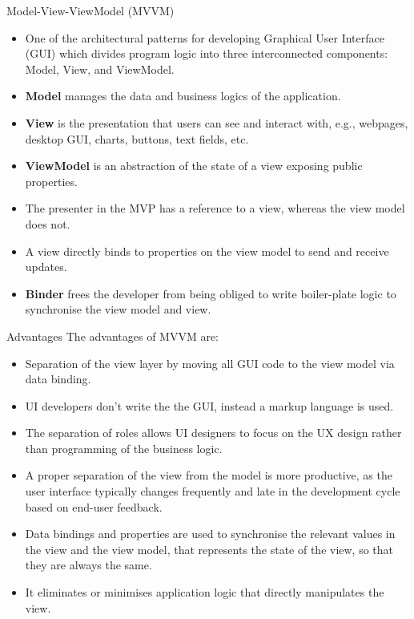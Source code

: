 \documentclass{beamer}
\begin{document}
\begin{frame}{Model-View-ViewModel (MVVM)}
\begin{itemize}
\item One of the architectural patterns for developing Graphical User Interface (GUI) which divides program logic into three interconnected components: Model, View, and ViewModel.
\item \textbf{Model} manages the data and business logics of the application.
\item \textbf{View} is the presentation that users can see and interact with, e.g., webpages, desktop GUI, charts, buttons, text fields, etc.
\item \textbf{ViewModel} is an abstraction of the state of a view exposing public properties. 
\item The presenter in the MVP has a reference to a view, whereas the view model does not. 
\item A view directly binds to properties on the view model to send and receive updates.
\item \textbf{Binder} frees the developer from being obliged to write boiler-plate logic to synchronise the view model and view.  

\end{itemize}
\end{frame}

\begin{frame}{Advantages}
The advantages of MVVM are:
\begin{itemize}
\item Separation of the view layer by moving all GUI code to the view model via data binding.
\item UI developers don't write the the GUI, instead a markup language is used.
\item The separation of roles allows UI designers to focus on the UX design rather than programming of the business logic. 
\item A proper separation of the view from the model is more productive, as the user interface typically changes frequently and late in the development cycle based on end-user feedback.
\item Data bindings and properties are used to synchronise the relevant values in the view and the view model, that represents the state of the view, so that they are always the same.
\item It eliminates or minimises application logic that directly manipulates the view. 

\end{itemize}
\end{frame}
\end{document}

